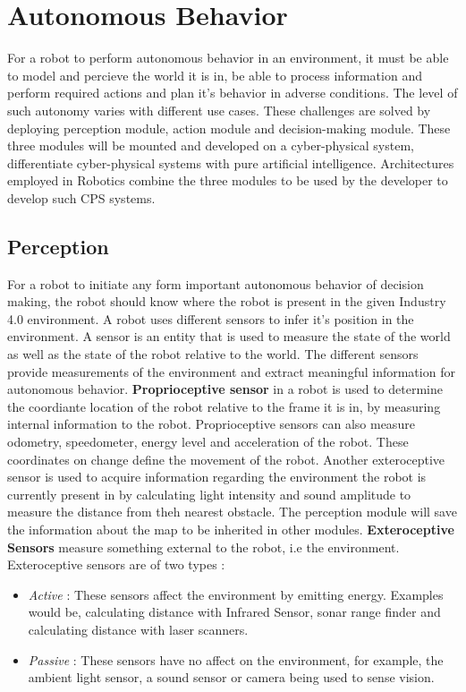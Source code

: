 \section{Autonomous Behavior}
For a robot to perform autonomous behavior in an environment, it must be able to model and percieve the world it is in, be able to process information
and perform required actions and plan it's behavior in adverse conditions. The level of such autonomy varies with different use cases. These challenges
are solved by deploying perception module, action module and decision-making module. These three modules will be mounted and developed on a cyber-physical
system, differentiate cyber-physical systems with pure artificial intelligence. Architectures employed in Robotics combine the three modules
to be used by the developer to develop such CPS systems.
\subsection{Perception}
For a robot to initiate any form important autonomous behavior of decision making, the robot should know where the robot is present in the given Industry 4.0 environment. A robot uses different sensors to infer it's position in the environment. A
sensor is an entity that is used to measure the state of the world as well as the state of the robot relative to the world. 
The different sensors provide measurements of the environment and extract meaningful information for autonomous behavior. \textbf{Proprioceptive sensor} in a robot is used to determine the coordiante location of the robot relative
to the frame it is in, by measuring internal information to the robot. Proprioceptive sensors can also measure odometry, speedometer, energy level and acceleration of the robot. These coordinates on change define the movement of the robot. Another exteroceptive sensor is used to acquire information regarding the environment the
robot is currently present in by calculating light intensity and sound amplitude to measure the distance from theh nearest obstacle. The perception module will save the information about the map to be
inherited in other modules. \textbf{Exteroceptive Sensors} measure something external to the robot, i.e the environment. Exteroceptive sensors are of two types : 
\begin{itemize}
    \item \textit{Active} : These sensors affect the environment by emitting energy. Examples would be, calculating distance with Infrared Sensor, sonar range finder and calculating distance with laser scanners.
    \item \textit{Passive} : These sensors have no affect on the environment, for example, the ambient light sensor, a sound sensor or camera being used to sense vision.
\end{itemize} 

